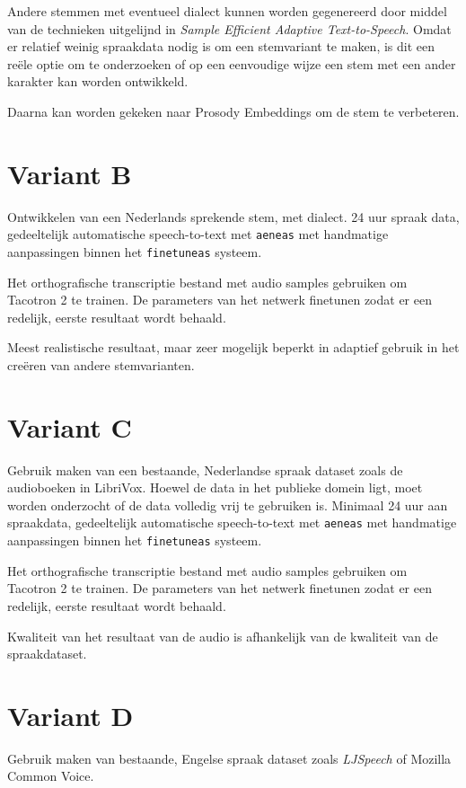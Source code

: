 Andere stemmen met eventueel dialect kunnen worden gegenereerd door middel van de technieken uitgelijnd in \textit{Sample Efficient Adaptive Text-to-Speech}. Omdat er relatief weinig spraakdata nodig is om een stemvariant te maken, is dit een reële optie om te onderzoeken of op een eenvoudige wijze een stem met een ander karakter kan worden ontwikkeld.

Daarna kan worden gekeken naar Prosody Embeddings om de stem te verbeteren.

\section{Variant B}
Ontwikkelen van een Nederlands sprekende stem, met dialect. 24 uur spraak data, gedeeltelijk automatische speech-to-text met \texttt{aeneas} met handmatige aanpassingen binnen het \texttt{finetuneas} systeem.

Het orthografische transcriptie bestand met audio samples gebruiken om Tacotron 2 te trainen. De parameters van het netwerk finetunen zodat er een redelijk, eerste resultaat wordt behaald.

Meest realistische resultaat, maar zeer mogelijk beperkt in adaptief gebruik in het creëren van andere stemvarianten.

\section{Variant C}
Gebruik maken van een bestaande, Nederlandse spraak dataset zoals de audioboeken in LibriVox. Hoewel de data in het publieke domein ligt, moet worden onderzocht of de data volledig vrij te gebruiken is. Minimaal 24 uur aan spraakdata, gedeeltelijk automatische speech-to-text met \texttt{aeneas} met handmatige aanpassingen binnen het \texttt{finetuneas} systeem.

Het orthografische transcriptie bestand met audio samples gebruiken om Tacotron 2 te trainen. De parameters van het netwerk finetunen zodat er een redelijk, eerste resultaat wordt behaald.

Kwaliteit van het resultaat van de audio is afhankelijk van de kwaliteit van de spraakdataset.

\section{Variant D}
Gebruik maken van bestaande, Engelse spraak dataset zoals \textit{LJSpeech} of Mozilla Common Voice.
